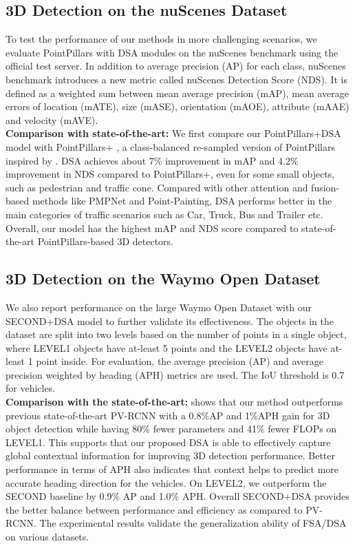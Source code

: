 \documentclass[10pt,twocolumn,letterpaper]{article}
\begin{document}
\subsection{3D Detection on the nuScenes Dataset}
To test the performance of our methods in more challenging scenarios, we evaluate PointPillars with DSA modules on the nuScenes benchmark using the official test server. In addition to average precision (AP) for each class, nuScenes benchmark introduces a new metric called nuScenes Detection Score (NDS). It is defined as a weighted sum between mean average precision (mAP), mean average errors of location (mATE), size (mASE), orientation (mAOE), attribute (mAAE) and velocity (mAVE).
\vspace{0.1cm}
\\ \textbf{Comparison with state-of-the-art:}
We first compare our PointPillars+DSA model with PointPillars+ \cite{pointpainting}, a class-balanced re-sampled version of PointPillars inspired by \cite{cbgs}. DSA achieves about 7\% improvement in mAP and 4.2\% improvement in NDS compared to PointPillars+, even for some small objects, such as pedestrian and traffic cone. Compared with other attention and fusion-based methods like PMPNet and Point-Painting, DSA performs better in the main categories of traffic scenarios such as Car, Truck, Bus and Trailer etc. Overall, our model has the highest mAP and NDS score compared to state-of-the-art PointPillars-based 3D detectors.

\subsection{3D Detection on the Waymo Open Dataset}
We also report performance on the large Waymo Open Dataset with our SECOND+DSA model to further validate its effectiveness. The objects in the dataset are split into two levels based on the number of points in a single object, where LEVEL1 objects have at-least 5 points and the LEVEL2 objects have at-least 1 point inside. For evaluation, the average precision (AP) and average precision weighted by heading (APH) metrics are used. The IoU threshold is 0.7 for vehicles. 
\vspace{0.1cm}
\\ \textbf{Comparison with the state-of-the-art:}  shows that our method outperforms previous state-of-the-art PV-RCNN with a 0.8\%AP and 1\%APH gain for 3D object detection while having 80\% fewer parameters and 41\% fewer FLOPs on LEVEL1. This supports that our proposed DSA is able to effectively capture global contextual information for improving 3D detection  performance. Better performance in terms of APH also indicates that context helps to predict more accurate heading direction for the vehicles. On LEVEL2, we outperform the SECOND baseline by 0.9\% AP and 1.0\% APH. Overall SECOND+DSA provides the better balance between performance and efficiency as compared to PV-RCNN. The experimental results validate the generalization ability of FSA/DSA on various datasets.
\end{document}
